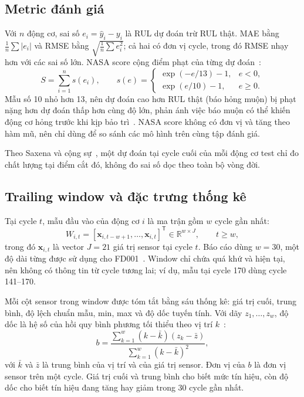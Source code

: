 \subsection{Metric đánh giá}
Với $n$ động cơ, sai số $e_i=\hat{y}_i-y_i$ là RUL dự đoán trừ RUL thật. MAE
bằng $\frac{1}{n}\sum|e_i|$ và RMSE bằng $\sqrt{\frac{1}{n}\sum e_i^2}$; cả hai
có đơn vị cycle, trong đó RMSE nhạy hơn với các sai số lớn. NASA score cộng
điểm phạt của từng dự đoán~\cite{li2018rul}:
\begin{equation}
 S=\sum_{i=1}^{n}s(e_i),\qquad
 s(e)=
 \begin{cases}
  \exp(-e/13)-1, & e<0,\\
  \exp(e/10)-1, & e\geq 0.
 \end{cases}
 \label{eq:nasa-score}
\end{equation}
Mẫu số 10 nhỏ hơn 13, nên dự đoán cao hơn RUL thật (báo hỏng muộn) bị phạt nặng
hơn dự đoán thấp hơn cùng độ lớn, phản ánh việc báo muộn có thể khiến động cơ
hỏng trước khi kịp bảo trì~\cite{saxena2008damage}. NASA score không có đơn vị và tăng theo hàm
mũ, nên chỉ dùng để so sánh các mô hình trên cùng tập đánh giá.

Theo Saxena và cộng sự~\cite{saxena2010metrics}, một dự đoán tại cycle cuối của
mỗi động cơ test chỉ đo chất lượng tại điểm cắt đó, không đo sai số dọc theo
toàn bộ vòng đời.

\subsection{Trailing window và đặc trưng thống kê}
Tại cycle $t$, mẫu đầu vào của động cơ $i$ là ma trận gồm $w$ cycle gần nhất:
\begin{equation}
 W_{i,t}=[\mathbf{x}_{i,t-w+1},\ldots,\mathbf{x}_{i,t}]^{\mathsf T}
 \in\mathbb{R}^{w\times J},\qquad t\geq w,
 \label{eq:window}
\end{equation}
trong đó $\mathbf{x}_{i,t}$ là vector $J=21$ giá trị sensor tại cycle $t$. Báo
cáo dùng $w=30$, một độ dài từng được sử dụng cho FD001~\cite{li2018rul}. Window
chỉ chứa quá khứ và hiện tại, nên không có thông tin từ cycle tương lai; ví dụ,
mẫu tại cycle 170 dùng cycle 141--170.

Mỗi cột sensor trong window được tóm tắt bằng sáu thống kê: giá trị cuối, trung
bình, độ lệch chuẩn mẫu, min, max và độ dốc tuyến tính. Với dãy $z_1,\ldots,z_w$,
độ dốc là hệ số của hồi quy bình phương tối thiểu theo vị trí $k$~\cite{hyndman2021fpp3}:
\begin{equation}
 b=\frac{\sum_{k=1}^{w}(k-\bar{k})(z_k-\bar{z})}
 {\sum_{k=1}^{w}(k-\bar{k})^2},
 \label{eq:slope}
\end{equation}
với $\bar{k}$ và $\bar{z}$ là trung bình của vị trí và của giá trị sensor. Đơn
vị của $b$ là đơn vị sensor trên một cycle. Giá trị cuối và trung bình cho biết
mức tín hiệu, còn độ dốc cho biết tín hiệu đang tăng hay giảm trong 30 cycle
gần nhất.

